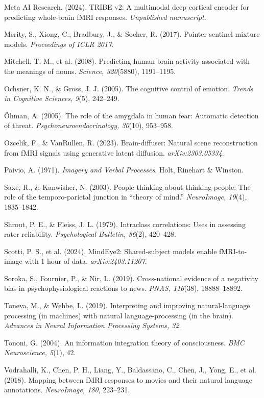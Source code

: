 \documentclass[11pt,letterpaper]{article}
\begin{document}
Meta AI Research. (2024). TRIBE v2: A multimodal deep cortical encoder for predicting whole-brain fMRI responses. \textit{Unpublished manuscript}.

Merity, S., Xiong, C., Bradbury, J., \& Socher, R. (2017). Pointer sentinel mixture models. \textit{Proceedings of ICLR 2017}.

Mitchell, T. M., et al. (2008). Predicting human brain activity associated with the meanings of nouns. \textit{Science, 320}(5880), 1191--1195.

Ochsner, K. N., \& Gross, J. J. (2005). The cognitive control of emotion. \textit{Trends in Cognitive Sciences, 9}(5), 242--249.

\"{O}hman, A. (2005). The role of the amygdala in human fear: Automatic detection of threat. \textit{Psychoneuroendocrinology, 30}(10), 953--958.

Ozcelik, F., \& VanRullen, R. (2023). Brain-diffuser: Natural scene reconstruction from fMRI signals using generative latent diffusion. \textit{arXiv:2303.05334}.

Paivio, A. (1971). \textit{Imagery and Verbal Processes}. Holt, Rinehart \& Winston.

Saxe, R., \& Kanwisher, N. (2003). People thinking about thinking people: The role of the temporo-parietal junction in ``theory of mind.'' \textit{NeuroImage, 19}(4), 1835--1842.

Shrout, P. E., \& Fleiss, J. L. (1979). Intraclass correlations: Uses in assessing rater reliability. \textit{Psychological Bulletin, 86}(2), 420--428.

Scotti, P. S., et al. (2024). MindEye2: Shared-subject models enable fMRI-to-image with 1 hour of data. \textit{arXiv:2403.11207}.

Soroka, S., Fournier, P., \& Nir, L. (2019). Cross-national evidence of a negativity bias in psychophysiological reactions to news. \textit{PNAS, 116}(38), 18888--18892.

Toneva, M., \& Wehbe, L. (2019). Interpreting and improving natural-language processing (in machines) with natural language-processing (in the brain). \textit{Advances in Neural Information Processing Systems, 32}.

Tononi, G. (2004). An information integration theory of consciousness. \textit{BMC Neuroscience, 5}(1), 42.

Vodrahalli, K., Chen, P. H., Liang, Y., Baldassano, C., Chen, J., Yong, E., et al. (2018). Mapping between fMRI responses to movies and their natural language annotations. \textit{NeuroImage, 180}, 223--231.
\end{document}
